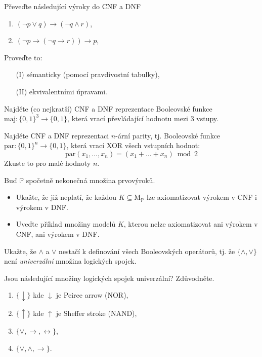 \documentclass[a4paper,12pt]{article}
\begin{document}
    
\medskip\begin{problem} Převeďte následující výroky do CNF a DNF 
\begin{enumerate}
    \item $(\neg p \vee q)\to (\neg q \wedge r)$,
    \item $(\neg p \to (\neg q \to r))\to p$,
\end{enumerate}
Proveďte to:
\begin{itemize}
    \item[(I)] sémanticky (pomocí pravdivostní tabulky),
    \item[(II)]  ekvivalentními úpravami.
\end{itemize}    

\end{problem}
     
    
\medskip\begin{problem} Najděte (co nejkratší) CNF a DNF reprezentace Booleovské funkce $\mathrm{maj}\colon\{0,1\}^3\to \{0,1\}$, která vrací převládající hodnotu mezi 3 vstupy.
\end{problem}
    
    
\medskip\begin{problem} Najděte CNF a DNF reprezentaci $n$-ární parity, tj. Booleovské funkce $\mathrm{par}\colon\{0,1\}^n\to \{0,1\}$,
která vrací XOR všech vstupních hodnot:
$$
\mathrm{par}(x_1,\dots,x_n)=(x_1+\dots+x_n)\bmod 2
$$
Zkuste to pro malé hodnoty $n$.
\end{problem}
    
    
\medskip\begin{problem} Buď $\mathbb P$ spočetně nekonečná množina prvovýroků. 
\begin{itemize}
    \item Ukažte, že již neplatí, že každou $K\subseteq \mathrm{M}_\mathbb P$ lze axiomatizovat výrokem v CNF i výrokem v DNF.
    \item  Uveďte příklad množiny modelů $K$, kterou nelze axiomatizovat ani výrokem v CNF, ani výrokem v DNF.
\end{itemize}
\end{problem}


\medskip\begin{problem}
    Ukažte, že $\wedge$ a $\vee$ nestačí k definování všech Booleovských operátorů, tj. že $\{\wedge,\vee\}$ není \emph{univerzální} množina logických spojek.
    \end{problem}
    
    \medskip\begin{problem} Jsou následující množiny logických spojek univerzální? Zdůvodněte.
    \begin{enumerate}
        \item $\{\downarrow\}$ kde $\downarrow$ je Peirce arrow (NOR),
        \item $\{\uparrow\}$ kde $\uparrow$ je Sheffer stroke (NAND),
        \item $\{\vee, \rightarrow, \leftrightarrow\}$,
        \item $\{\vee, \wedge, \rightarrow\}$.
    \end{enumerate}
    \end{problem}
    
\end{document}
